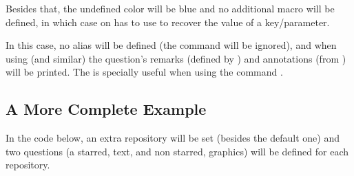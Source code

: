 \documentclass[10pt]{article}
\begin{document}
Besides that, the undefined color will be blue and no additional macro will be defined, in which case on has to use \tsobj{\QuestVal} to recover the value of a key/parameter.

\begin{codestore}
\usepackage[no alias, in review]{tikzquests}
\end{codestore}

In this case, no alias will be defined (the command  will be ignored), and when using \tsobj{\tikzQuestion} (and similar) the question's remarks (defined by ) and annotations (from \tsobj{\tikzQuestion}) will be printed. The  is specially useful when using the command \tsobj{\QuestionsList}.

\subsection{A More Complete Example}
In the code below, an extra repository will be set (besides the default one) and two questions (a starred, text, and non starred, graphics) will be defined for each repository.
\end{document}
